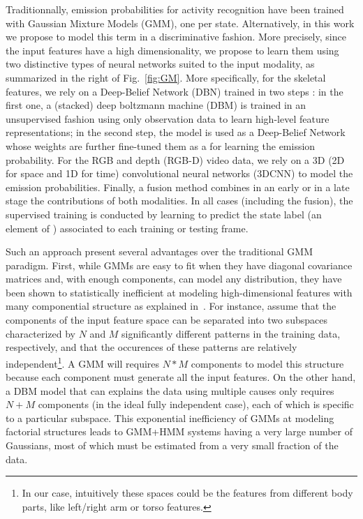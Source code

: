 Traditionnally, emission probabilities for activity recognition have been trained with Gaussian Mixture Models (GMM), one per state. 
%
Alternatively, in this work we propose to model this term in a discriminative fashion.
More precisely, since the input features have a high dimensionality, 
we propose to learn them using two distinctive types of neural networks suited to the input modality,
as summarized in the right of Fig.~\ref{fig:GM}. 
%
More specifically, for  the skeletal features, we rely on a Deep-Belief Network (DBN) trained in two steps \cite{salakhutdinov2009learning}:
in the first one,  a (stacked) deep boltzmann machine (DBM) is trained in an unsupervised fashion using only observation data
to learn  high-level feature representations;
in the second step, the model is used as a Deep-Belief Network 
whose weights are further fine-tuned them as a 
for learning the emission probability.
%
For the RGB and depth (RGB-D) video data, we rely on a 3D (2D for space and 1D for time) 
convolutional neural networks (3DCNN) to model the emission probabilities.
%
Finally, a fusion method combines in an early or in a late stage the contributions of both modalities.
%
In all cases (including the fusion), the supervised training is conducted by learning to 
predict the state label (an element of \finiteset) associated to each training or testing frame.


Such an approach present several advantages over the traditional GMM paradigm.
%
First, while  GMMs are easy to fit when they have diagonal covariance matrices and, with enough components, 
can model any distribution, they have been shown to statistically inefficient at modeling high-dimensional features 
with many componential structure as explained in~\cite{mohamed2012acoustic}.
%
For instance, assume that the components of the input feature space can be separated into two subspaces
characterized by  $N$  and $M$ significantly different  patterns in the training data, respectively, and that the occurences 
of these patterns are relatively independent\footnote{In our case, intuitively these spaces could be the  features from different body parts, 
like left/right arm or torso features.}. 
%
A GMM will requires $N*M$ components to model this structure because each component must generate all the input features.
%
On the other hand, a DBM model that can explains the data using multiple causes only requires $N+M$ components
(in the ideal fully independent case), each of which is specific to a particular subspace. 
%
This exponential inefficiency of GMMs at modeling factorial structures leads to GMM+HMM systems having 
a very large number of Gaussians, most of which must be estimated from a very small fraction of the data.


